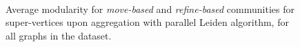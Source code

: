 \begin{figure}[hbtp]
  \centering
   \\[-2ex]
  \caption{Average modularity for \textit{move-based} and \textit{refine-based} communities for super-vertices upon aggregation with parallel Leiden algorithm, for all graphs in the dataset.}
  \label{fig:leidenreopt-modularity}
\end{figure}
